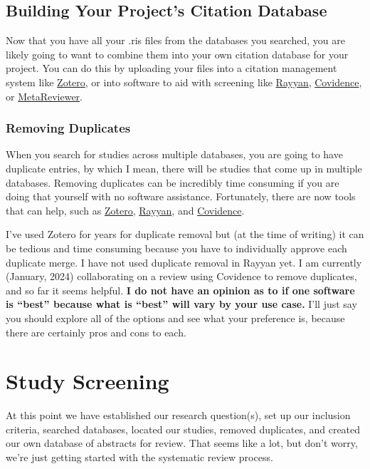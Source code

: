 \documentclass[
]{book}
\begin{document}
\hypertarget{building-your-projects-citation-database}{%
\section{Building Your Project's Citation Database}\label{building-your-projects-citation-database}}

Now that you have all your .ris files from the databases you searched, you are likely going to want to combine them into your own citation database for your project. You can do this by uploading your files into a citation management system like \href{https://www.zotero.org/}{Zotero}, or into software to aid with screening like \href{https://www.rayyan.ai/}{Rayyan}, \href{https://www.covidence.org/}{Covidence}, or \href{https://www.metareviewer.org/}{MetaReviewer}.

\hypertarget{removing-duplicates}{%
\subsection{Removing Duplicates}\label{removing-duplicates}}

When you search for studies across multiple databases, you are going to have duplicate entries, by which I mean, there will be studies that come up in multiple databases. Removing duplicates can be incredibly time consuming if you are doing that yourself with no software assistance. Fortunately, there are now tools that can help, such as \href{https://www.zotero.org/}{Zotero}, \href{https://www.rayyan.ai/}{Rayyan}, and \href{https://www.covidence.org/}{Covidence}.

I've used Zotero for years for duplicate removal but (at the time of writing) it can be tedious and time consuming because you have to individually approve each duplicate merge. I have not used duplicate removal in Rayyan yet. I am currently (January, 2024) collaborating on a review using Covidence to remove duplicates, and so far it seems helpful. \textbf{I do not have an opinion as to if one software is ``best'' because what is ``best'' will vary by your use case.} I'll just say you should explore all of the options and see what your preference is, because there are certainly pros and cons to each.

\hypertarget{screening}{%
\chapter{Study Screening}\label{screening}}

At this point we have established our research question(s), set up our inclusion criteria, searched databases, located our studies, removed duplicates, and created our own database of abstracts for review. That seems like a lot, but don't worry, we're just getting started with the systematic review process.
\end{document}
